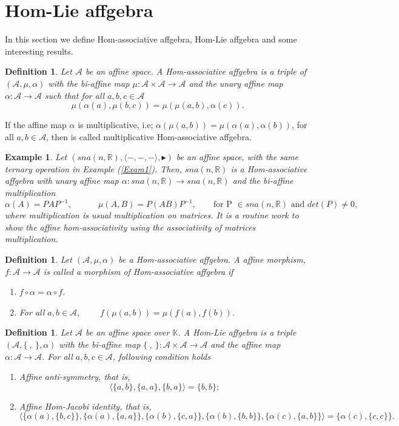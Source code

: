 \documentclass[14pt]{article}
\theoremstyle{Definition}
\newtheorem{Def}[thm]{Definition}
\newtheorem{Exam}[thm]{Example}
\theoremstyle{remark}
\begin{document}
\section{Hom-Lie affgebra}
In this section we define Hom-associative affgebra, Hom-Lie affgebra and some interesting results.
\begin{Def}
 Let $\mathcal{A}$ be an affine space. A Hom-associative affgebra is a triple of $(\mathcal{A},\mu,\alpha)$ with the bi-affine map $\mu:\mathcal{A}\times\mathcal{A}\rightarrow \mathcal{A}$ and the unary affine map $\alpha:\mathcal{A}\rightarrow \mathcal{A}$ such that for all $a,b,c\in \mathcal{A}$  
$$
\mu(\alpha(a),\mu(b,c))=\mu(\mu(a,b),\alpha(c)).
$$
\end{Def}
If the affine map $\alpha$ is multiplicative, i.e; $\alpha(\mu(a,b))=\mu(\alpha(a),\alpha(b))$, for all $a,b\in \mathcal{A}$, then is called multiplicative Hom-associative affgebra.
\begin{Exam}
Let $(sna(n,\mathbb{R}),\langle-,-,-\rangle,\blacktriangleright)$ be an affine space, with the same ternary operation in Example (\ref{Exam1}). Then, $sna(n,\mathbb{R})$ is a Hom-associative affgebra with unary affine map $\alpha:sna(n,\mathbb{R})\rightarrow sna(n,\mathbb{R})$ and the bi-affine multiplication 
$$\alpha(A)=PAP^{-1},~~~~~~~~~~~~~~\mu(A,B)=P(AB)P^{-1},~~~~~~~~~\text{for P $\in sna(n,\mathbb{R})$ and $det(P)\neq 0$,}$$
where multiplication is usual multiplication on matrices. It is a routine work to show the affine hom-associativity using the associativity of matrices multiplication.
\end{Exam}
\begin{Def}
Let $(\mathcal{A},\mu,\alpha)$ be a Hom-associative affgebra. A affine morphism, $f:\mathcal{A}\rightarrow \mathcal{A}$ is called a morphism of Hom-associative affgebra if 
\begin{enumerate}
\item[(i)] $f\circ\alpha=\alpha\circ f$.
\item[(ii)] For all $a,b\in \mathcal{A}$,~~~~
$
f(\mu(a,b))=\mu(f(a),f(b)).
$
\end{enumerate}
\end{Def}
\begin{Def}
Let $\mathcal{A}$ be an affine space over $\mathbb{K}$. A Hom-Lie affgebra is a triple $(\mathcal{A},\{~,~\},\alpha)$ with the bi-affine map $\{~,~\}:\mathcal{A} \times \mathcal{A}\rightarrow \mathcal{A}$ and the affine map $\alpha:\mathcal{A}\rightarrow \mathcal{A}$. For all $a,b,c\in \mathcal{A}$, following condition holds
\begin{enumerate}
\item[(a)] Affine anti-symmetry, that is,
$$
\langle\{a,b\},\{a,a\},\{b,a\}\rangle=\{b,b\};
$$ 
\item[(b)]Affine Hom-Jacobi identity, that is,
$$
\langle \{\alpha(a),\{b,c\}\},\{\alpha(a),\{a,a\}\},\{\alpha(b),\{c,a\}\},\{\alpha(b),\{b,b\}\},\{\alpha(c),\{a,b\}\}\rangle=\{\alpha(c),\{c,c\}\}.
$$
\end{enumerate}
\end{Def}
\end{document}

